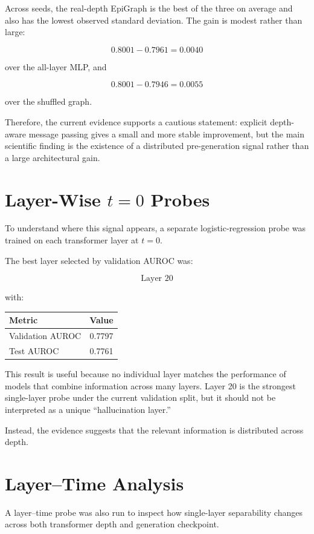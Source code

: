 \documentclass[11pt]{article}
\begin{document}
Across seeds, the real-depth EpiGraph is the best of the three on average and also has the lowest observed standard deviation. The gain is modest rather than large:

\[
0.8001 - 0.7961 = 0.0040
\]

over the all-layer MLP, and

\[
0.8001 - 0.7946 = 0.0055
\]

over the shuffled graph.

Therefore, the current evidence supports a cautious statement: explicit depth-aware message passing gives a small and more stable improvement, but the main scientific finding is the existence of a distributed pre-generation signal rather than a large architectural gain.

\section{Layer-Wise \(t=0\) Probes}

To understand where this signal appears, a separate logistic-regression probe was trained on each transformer layer at \(t=0\).

The best layer selected by validation AUROC was:

\[
\boxed{\text{Layer 20}}
\]

with:

\begin{center}
\begin{tabular}{lc}
\toprule
Metric & Value \\
\midrule
Validation AUROC & 0.7797 \\
Test AUROC & 0.7761 \\
\bottomrule
\end{tabular}
\end{center}

This result is useful because no individual layer matches the performance of models that combine information across many layers. Layer 20 is the strongest single-layer probe under the current validation split, but it should not be interpreted as a unique ``hallucination layer.''

Instead, the evidence suggests that the relevant information is distributed across depth.

\section{Layer--Time Analysis}

A layer--time probe was also run to inspect how single-layer separability changes across both transformer depth and generation checkpoint.
\end{document}
